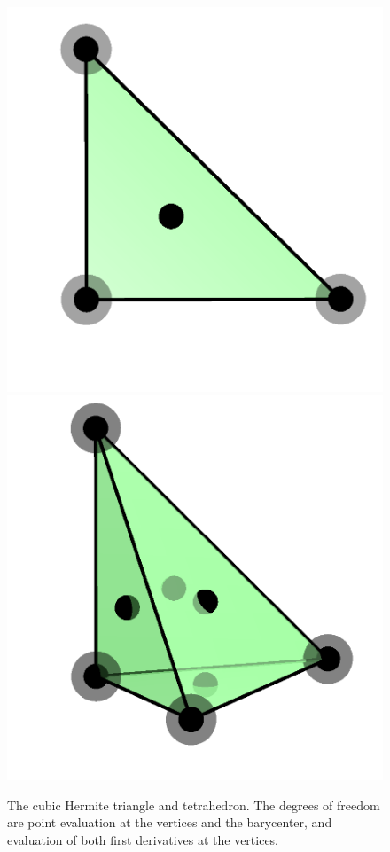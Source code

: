 \begin{figure}
  \centering
  \includegraphics[width=\twofigs]{chapters/kirby-6/png/HER_2d.png}
  \includegraphics[width=\twofigs]{chapters/kirby-6/png/HER_3d.png}
  \caption{The cubic Hermite triangle and tetrahedron. The degrees
    of freedom are point evaluation at the vertices and the
    barycenter, and evaluation of both first derivatives at the
    vertices.}
\end{figure}

